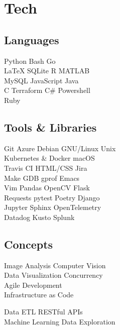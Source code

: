 \documentclass[]{jidicula-resume}
\begin{document}
\section{Tech}
\begin{minipage}[t]{.32\textwidth}
  \subsection{Languages}
  Python \textbullet{} Bash \textbullet{} Go \\
  \LaTeX{} \textbullet{} SQLite \textbullet{} R \textbullet{} MATLAB  \\
  MySQL \textbullet{} JavaScript \textbullet{} Java \\
  C \textbullet{} Terraform \textbullet{} C\# \textbullet{} Powershell \\
  Ruby
  \sectionsep{}
\end{minipage}
\hfill
\begin{minipage}[t]{.32\textwidth}
  \subsection{Tools \& Libraries}
  Git \textbullet{} Azure \textbullet{} {Debian GNU/Linux} \textbullet{} Unix \\
  Kubernetes \& Docker \textbullet{} macOS \\
  Travis CI \textbullet{} HTML/CSS \textbullet{} Jira \textbullet{} \\
  Make \textbullet{} GDB \textbullet{} gprof \textbullet{} Emacs \\
  Vim \textbullet{} Pandas \textbullet{} OpenCV \textbullet{} Flask \\
  Requests \textbullet{} pytest \textbullet{} Poetry \textbullet{} Django \\
  Jupyter \textbullet{} Sphinx \textbullet{} OpenTelemetry \\
  Datadog \textbullet{} Kusto \textbullet{} Splunk
  \sectionsep{}
\end{minipage}
\hfill
\begin{minipage}[t]{.32\textwidth}
  \subsection{Concepts}
  Image Analysis \textbullet{} Computer Vision \\
  Data Visualization \textbullet{} Concurrency \\
  Agile Development \\
  Infrastructure as Code
  
  Data ETL \textbullet{} RESTful APIs \\
  Machine Learning \textbullet{} Data Exploration
  \sectionsep{}
\end{minipage}
\end{document}
